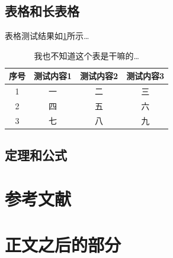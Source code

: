 		\subsection{表格和长表格}
表格测试结果如\ref{tab:test3}所示\ldots
\begin{table}[h]
\begin{center}
\caption{我也不知道这个表是干嘛的\ldots \label{tab:test3}}
\begin{tabular}{c||c|c|c}
\hline
序号&测试内容1&测试内容2&测试内容3\\
\hline \hline
1&一&二&三\\
\hline
2&四&五&六\\
\hline
3&七&八&九\\
\hline
\end{tabular}
\end{center}
\end{table}
		\subsection{定理和公式}
	\newpage
	\section{参考文献}
	\section{正文之后的部分}
